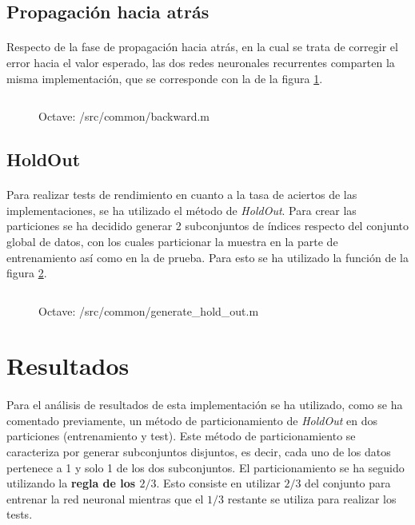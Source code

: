 \documentclass[10pt, a4paper,spanish]{article}
\begin{document}
		\subsection{Propagación hacia atrás}
			\paragraph{}
			Respecto de la fase de propagación hacia atrás, en la cual se trata de corregir el error hacia el valor esperado, las dos redes neuronales recurrentes comparten la misma implementación, que se corresponde con la de la figura \ref{code:backward}.

			\begin{figure}[htpb!]
				\centering
				\inputminted{octave}{../src/common/backward.m}
				\caption{Octave: /src/common/backward.m}
				\label{code:backward}
			\end{figure}


		\subsection{HoldOut}
			\paragraph{}
			Para realizar tests de rendimiento en cuanto a la tasa de aciertos de las implementaciones, se ha utilizado el método de \emph{HoldOut}. Para crear las particiones se ha decidido generar 2 subconjuntos de índices respecto del conjunto global de datos, con los cuales particionar la muestra en la parte de entrenamiento así como en la de prueba. Para esto se ha utilizado la función de la figura \ref{code:generate_hold_out}.

			\begin{figure}[htpb!]
				\centering
				\inputminted{octave}{../src/common/generate_hold_out.m}
				\caption{Octave: /src/common/generate\_hold\_out.m}
				\label{code:generate_hold_out}
			\end{figure}

	\section{Resultados}

		\paragraph{}
		Para el análisis de resultados de esta implementación se ha utilizado, como se ha comentado previamente, un método de particionamiento de \emph{HoldOut} en dos particiones (entrenamiento y test). Este método de particionamiento se caracteriza por generar subconjuntos disjuntos, es decir, cada uno de los datos pertenece a 1 y solo 1 de los dos subconjuntos. El particionamiento se ha seguido utilizando la \textbf{regla de los $2/3$}. Esto consiste en utilizar $2/3$ del conjunto para entrenar la red neuronal mientras que el $1/3$ restante se utiliza para realizar los tests.
\end{document}
